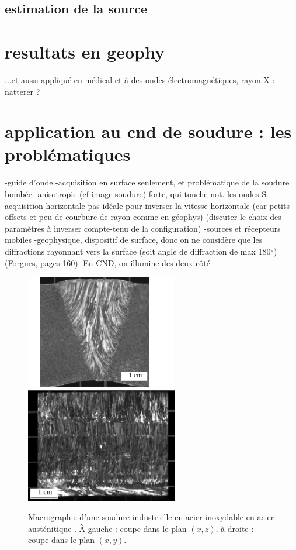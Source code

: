 \subsection{estimation de la source}





\section{resultats en geophy}

...et aussi appliqué en médical et à des ondes électromagnétiques, rayon X : natterer ?

\section{application au cnd de soudure : les problématiques}

-guide d'onde
-acquisition en surface seulement, et problématique de la soudure bombée
-anisotropie (cf image soudure) forte, qui touche not. les ondes S.
-acquisition horizontale pas idéale pour inverser la vitesse horizontale (car petits offsets et peu de courbure de rayon comme en géophys) (discuter le choix des paramètres à inverser compte-tenu de la configuration)
-sources et récepteurs mobiles 
-geophysique, dispositif de surface, donc on ne considère que les diffractions rayonnant vers la surface (soit angle de diffraction de max 180°)(Forgues, pages 160). En CND, on illumine des deux côté


\begin{figure}
	\includegraphics[height=5cm]{./img/soudure1.png}
	\includegraphics[height=5cm]{./img/soudure2.png}
	\caption{Macrographie d'une soudure industrielle en acier inoxydable en acier austénitique \citep{chassignole}. À gauche : coupe dans le plan $(x,z)$, à droite : coupe dans le plan $(x,y)$.}
\end{figure}


